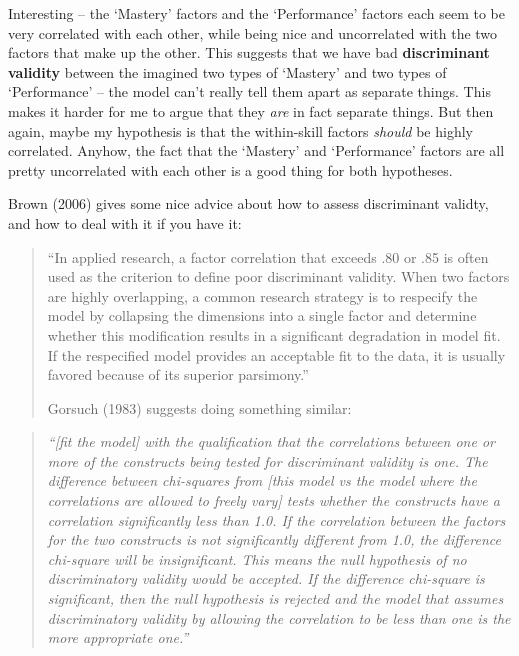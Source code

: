 \documentclass[
  letterpaper,
  DIV=11,
  numbers=noendperiod]{scrreprt}
\begin{document}
Interesting -- the `Mastery' factors and the `Performance' factors each
seem to be very correlated with each other, while being nice and
uncorrelated with the two factors that make up the other. This suggests
that we have bad \textbf{discriminant validity} between the imagined two
types of `Mastery' and two types of `Performance' -- the model can't
really tell them apart as separate things. This makes it harder for me
to argue that they \emph{are} in fact separate things. But then again,
maybe my hypothesis is that the within-skill factors \emph{should} be
highly correlated. Anyhow, the fact that the `Mastery' and `Performance'
factors are all pretty uncorrelated with each other is a good thing for
both hypotheses.

Brown (2006) gives some nice advice about how to assess discriminant
validty, and how to deal with it if you have it:

\begin{quote}
``In applied research, a factor correlation that exceeds .80 or .85 is
often used as the criterion to define poor discriminant validity. When
two factors are highly overlapping, a common research strategy is to
respecify the model by collapsing the dimensions into a single factor
and determine whether this modification results in a significant
degradation in model fit. If the respecified model provides an
acceptable fit to the data, it is usually favored because of its
superior parsimony.''

Gorsuch (1983) suggests doing something similar:
\end{quote}

\begin{quote}
\emph{``{[}fit the model{]} with the qualification that the correlations
between one or more of the constructs being tested for discriminant
validity is one. The difference between chi-squares from {[}this model
vs the model where the correlations are allowed to freely vary{]} tests
whether the constructs have a correlation significantly less than 1.0.
If the correlation between the factors for the two constructs is not
significantly different from 1.0, the difference chi-square will be
insignificant. This means the null hypothesis of no discriminatory
validity would be accepted. If the difference chi-square is significant,
then the null hypothesis is rejected and the model that assumes
discriminatory validity by allowing the correlation to be less than one
is the more appropriate one.''}
\end{quote}
\end{document}
